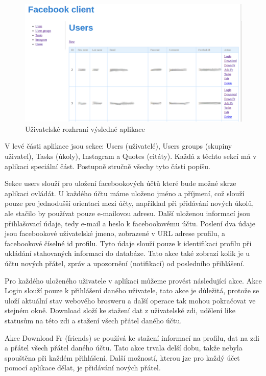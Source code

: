\documentclass[thesis=M,czech]{FITthesis}[2013/05/10]
\begin{document}
\begin{figure}[h]
\begin{center}
\includegraphics[width=5in]{figures/fcUI.png}
\caption{Uživatelské rozhraní výsledné aplikace}
\label{fig:fcUI}
\end{center}
\end{figure}

V levé části aplikace jsou sekce: Users (uživatelé), Users groups (skupiny uživatel), Tasks (úkoly), Instagram a Quotes (citáty). Každá z těchto sekcí má v aplikaci speciální část. Postupně stručně všechy tyto části popíšu.

Sekce users slouží pro uložení facebookových účtů které bude možné skrze aplikaci ovládát. U každého účtu máme uloženo jméno a příjmení, což slouží pouze pro jednodušší orientaci mezi účty, například při přidávání nových úkolů, ale stačilo by používat pouze e-mailovou adresu. Další uloženou informací jsou přihlašovací údaje, tedy e-mail a heslo k facebookovému účtu. Poslení dva údaje jsou facebookové uživatelské jmeno, zobrazené v URL adrese profilu, a facebookové číselné id profilu. Tyto údaje slouží pouze k identifikaci profilu při ukládání stahovaných informací do databáze. Tato akce také zobrazí kolik je u účtu nových přátel, zpráv a upozornění (notifikací) od posledního přihlášení.

Pro každého uloženého uživatele v aplikaci můžeme provést následující akce. Akce Login slouží pouze k přihlášení daného uživatele, tato akce je důležitá, protože se uloží aktuální stav webového brosweru a další operace tak mohou pokračovat ve stejném okně. Download složí ke stažení dat z uživatelské zdi, udělení like statusům na této zdi a stažení všech přátel daného účtu.

Akce Download Fr (friends) se používá ke stažení informací na profilu, dat na zdi a přátel všech přátel daného účtu. Tato akce trvala delší dobu, takže nebyla spouštěna při každém přihlášení. Další možností, kterou jze pro každý účet pomocí aplikace dělat, je přidávání nových přátel.
\end{document}

